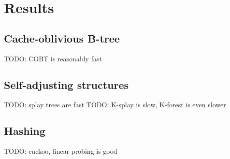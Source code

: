 \chapter{Results}
\label{chapter:results}

\section{Cache-oblivious B-tree}
TODO: COBT is reasonably fast

\section{Self-adjusting structures}
TODO: splay trees are fast
TODO: K-splay is slow, K-forest is even slower

\section{Hashing}
TODO: cuckoo, linear probing is good
